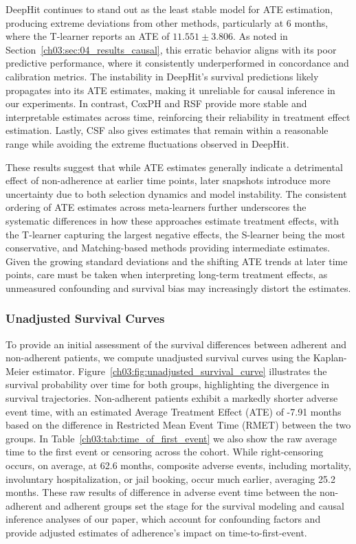 DeepHit continues to stand out as the least stable model for ATE estimation, producing extreme deviations from other methods, particularly at 6 months, where the T-learner reports an ATE of \(11.551 \pm 3.806\).
As noted in Section~\ref{ch03:sec:04_results_causal}, this erratic behavior aligns with its poor predictive performance, where it consistently underperformed in concordance and calibration metrics.
The instability in DeepHit’s survival predictions likely propagates into its ATE estimates, making it unreliable for causal inference in our experiments.
In contrast, CoxPH and RSF provide more stable and interpretable estimates across time, reinforcing their reliability in treatment effect estimation.
Lastly, CSF also gives estimates that remain within a reasonable range while avoiding the extreme fluctuations observed in DeepHit.

These results suggest that while ATE estimates generally indicate a detrimental effect of non-adherence at earlier time points, later snapshots introduce more uncertainty due to both selection dynamics and model instability.
The consistent ordering of ATE estimates across meta-learners further underscores the systematic differences in how these approaches estimate treatment effects, with the T-learner capturing the largest negative effects, the S-learner being the most conservative, and Matching-based methods providing intermediate estimates.
Given the growing standard deviations and the shifting ATE trends at later time points, care must be taken when interpreting long-term treatment effects, as unmeasured confounding and survival bias may increasingly distort the estimates.

\subsubsection{Unadjusted Survival Curves}
\label{ch03:apd:unadjusted_survival}

To provide an initial assessment of the survival differences between adherent and non-adherent patients, we compute unadjusted survival curves using the Kaplan-Meier estimator. 
Figure~\ref{ch03:fig:unadjusted_survival_curve} illustrates the survival probability over time for both groups, highlighting the divergence in survival trajectories. 
Non-adherent patients exhibit a markedly shorter adverse event time, with an estimated Average Treatment Effect (ATE) of -7.91 months based on the difference in Restricted Mean Event Time (RMET) between the two groups. 
In Table~\ref{ch03:tab:time_of_first_event} we also show the raw average time to the first event or censoring across the cohort. 
While right-censoring occurs, on average, at 62.6 months, composite adverse events, including mortality, involuntary hospitalization, or jail booking, occur much earlier, averaging 25.2 months. 
These raw results of difference in adverse event time between the non-adherent and adherent groups set the stage for the survival modeling and causal inference analyses of our paper, which account for confounding factors and provide adjusted estimates of adherence's impact on time-to-first-event.


